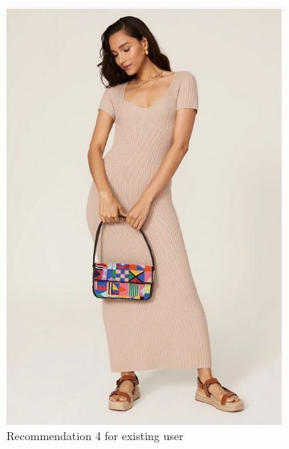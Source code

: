 \documentclass[conference]{IEEEtran}
\begin{document}
\begin{figure}[!htbp]
  \begin{subfigure}[b]{0.3\textwidth}
    \centering
    \includegraphics[width=\textwidth]{r4.jpg}
    \caption{Recommendation 4 for existing user}
    \label{fig:Recommendations4}
  \end{subfigure}
  \hfill
  \begin{subfigure}[b]{0.3\textwidth}
    \centering

\end{subfigure}
\end{figure}
\end{document}
